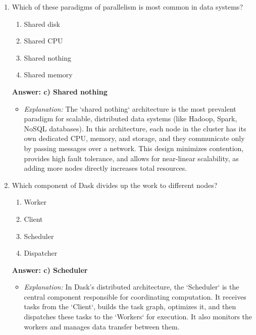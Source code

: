 \documentclass{article}
\begin{document}
\begin{enumerate}[label=\textbf{Question \arabic*.}]
\item Which of these paradigms of parallelism is most common in data systems?
    \begin{enumerate}[label=\alph*)]
        \item Shared disk
        \item Shared CPU
        \item Shared nothing
        \item Shared memory
    \end{enumerate}
    \textbf{Answer: c) Shared nothing}
    \begin{itemize}
        \item \textit{Explanation:} The `shared nothing` architecture is the most prevalent paradigm for scalable, distributed data systems (like Hadoop, Spark, NoSQL databases). In this architecture, each node in the cluster has its own dedicated CPU, memory, and storage, and they communicate only by passing messages over a network. This design minimizes contention, provides high fault tolerance, and allows for near-linear scalability, as adding more nodes directly increases total resources.
    \end{itemize}

\item Which component of Dask divides up the work to different nodes?
    \begin{enumerate}[label=\alph*)]
        \item Worker
        \item Client
        \item Scheduler
        \item Dispatcher
    \end{enumerate}
    \textbf{Answer: c) Scheduler}
    \begin{itemize}
        \item \textit{Explanation:} In Dask's distributed architecture, the `Scheduler` is the central component responsible for coordinating computation. It receives tasks from the `Client`, builds the task graph, optimizes it, and then dispatches these tasks to the `Workers` for execution. It also monitors the workers and manages data transfer between them.
    \end{itemize}


\end{enumerate}
\end{document}
